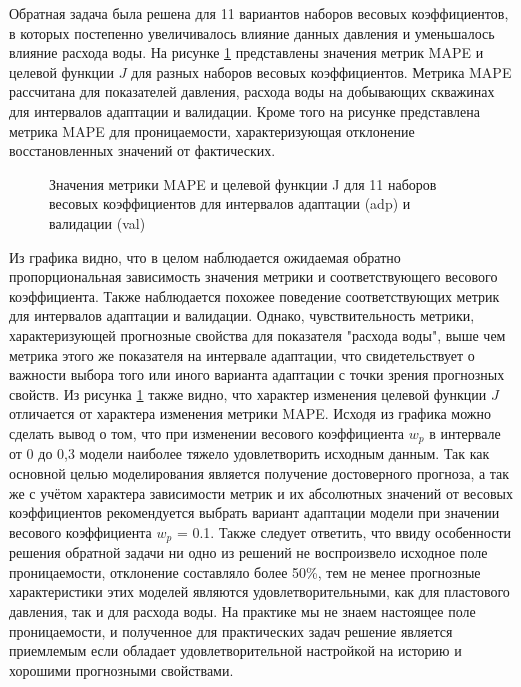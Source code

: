 \documentclass{article}
\begin{document}
Обратная задача была решена для 11 вариантов наборов весовых коэффициентов, в которых постепенно увеличивалось влияние данных давления и уменьшалось влияние расхода воды. На рисунке \ref{fig:wp} представлены значения метрик MAPE и целевой функции $J$ для разных наборов весовых коэффициентов. Метрика MAPE рассчитана для показателей давления, расхода воды на добывающих скважинах для интервалов адаптации и валидации. Кроме того на рисунке представлена метрика MAPE для проницаемости, характеризующая отклонение восстановленных значений от фактических.

\begin{figure}
	\caption{Значения метрики MAPE и целевой функции J для 11 наборов весовых коэффициентов для интервалов адаптации (adp) и валидации (val)}
	\label{fig:wp}
\end{figure}

Из графика видно, что в целом наблюдается ожидаемая обратно пропорциональная зависимость значения метрики и соответствующего весового коэффициента. Также наблюдается похожее поведение соответствующих метрик для интервалов адаптации и валидации. Однако, чувствительность метрики, характеризующей прогнозные свойства для показателя "расхода воды", выше чем метрика этого же показателя на интервале адаптации, что свидетельствует о важности выбора того или иного варианта адаптации с точки зрения прогнозных свойств. Из рисунка \ref{fig:wp} также видно, что характер изменения целевой функции $J$ отличается от характера изменения метрики MAPE. Исходя из графика можно сделать вывод о том, что при изменении весового коэффициента $w_p$ в интервале от 0 до 0,3 модели наиболее тяжело удовлетворить исходным данным. Так как основной целью моделирования является получение достоверного прогноза, а так же с учётом характера зависимости метрик и их абсолютных значений от весовых коэффициентов рекомендуется выбрать вариант адаптации модели при значении весового коэффициента $w_p$ = 0.1. Также следует ответить, что ввиду особенности решения обратной задачи ни одно из решений не воспроизвело исходное поле проницаемости, отклонение составляло более 50\%, тем не менее прогнозные характеристики этих моделей являются удовлетворительными, как для пластового давления, так и для расхода воды. На практике мы не знаем настоящее поле проницаемости, и полученное для практических задач решение является приемлемым если обладает удовлетворительной настройкой на историю и хорошими прогнозными свойствами. 
\end{document}
